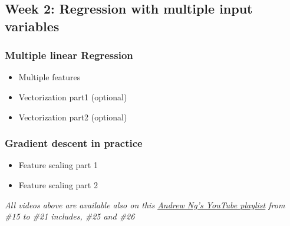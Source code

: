\subsection*{Week 2: Regression with multiple input variables}

\subsubsection*{Multiple linear Regression}  
\begin{itemize}
  \item Multiple features
  \item Vectorization part1 (optional)
  \item Vectorization part2 (optional)
\end{itemize}

\subsubsection*{Gradient descent in practice}  
\begin{itemize}
  \item Feature scaling part 1
  \item Feature scaling part 2
\end{itemize}

\emph{All videos above are available also on this \href{https://youtube.com/playlist?list=PLkDaE6sCZn6FNC6YRfRQc_FbeQrF8BwGI&feature=shared}{Andrew Ng's YouTube playlist} from \#15 to \#21 includes, \#25 and \#26}


